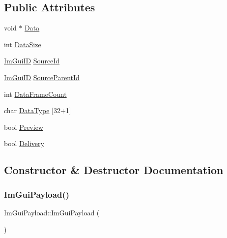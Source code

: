 \subsection*{Public Attributes}
\begin{DoxyCompactItemize}
\item 
void $\ast$ \mbox{\hyperlink{struct_im_gui_payload_af9f974dfb815e21a1ab925cab3769ab9}{Data}}
\item 
int \mbox{\hyperlink{struct_im_gui_payload_a6730d3ace5353afe204273995994cd92}{Data\+Size}}
\item 
\mbox{\hyperlink{imgui_8h_a1785c9b6f4e16406764a85f32582236f}{Im\+Gui\+ID}} \mbox{\hyperlink{struct_im_gui_payload_aa574f7e237c6d2172977d142b25c0111}{Source\+Id}}
\item 
\mbox{\hyperlink{imgui_8h_a1785c9b6f4e16406764a85f32582236f}{Im\+Gui\+ID}} \mbox{\hyperlink{struct_im_gui_payload_a1757c714dd47f09b645a8eba2912849d}{Source\+Parent\+Id}}
\item 
int \mbox{\hyperlink{struct_im_gui_payload_ab9f21d2454197d14896d5812ba70fa33}{Data\+Frame\+Count}}
\item 
char \mbox{\hyperlink{struct_im_gui_payload_a72ecfe510eb35932e54f11ee56fe7140}{Data\+Type}} \mbox{[}32+1\mbox{]}
\item 
bool \mbox{\hyperlink{struct_im_gui_payload_a1a5b6456247ef3c213f0706cc9da16e6}{Preview}}
\item 
bool \mbox{\hyperlink{struct_im_gui_payload_a4c0900e12c8d0bf6869c0ac6f8a66e31}{Delivery}}
\end{DoxyCompactItemize}


\subsection{Constructor \& Destructor Documentation}
\mbox{\label{struct_im_gui_payload_a341c0039af838af0308a7449f8c1308b}} 
\subsubsection{\texorpdfstring{Im\+Gui\+Payload()}{ImGuiPayload()}}
{\footnotesize\ttfamily Im\+Gui\+Payload\+::\+Im\+Gui\+Payload (\begin{DoxyParamCaption}{ }\end{DoxyParamCaption})\hspace{0.3cm}{\ttfamily [inline]}}



